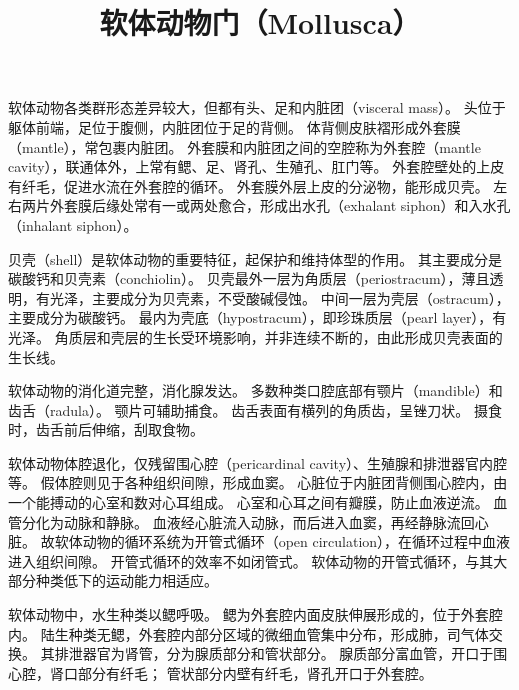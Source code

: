 \documentclass[11pt]{article}
\title{软体动物门（Mollusca）}
\date{}
\begin{document}
  \maketitle

  \linenumbers
软体动物各类群形态差异较大，但都有头、足和内脏团（visceral mass）。
头位于躯体前端，足位于腹侧，内脏团位于足的背侧。
体背侧皮肤褶形成外套膜（mantle），常包裹内脏团。
外套膜和内脏团之间的空腔称为外套腔（mantle cavity），联通体外，上常有鳃、足、肾孔、生殖孔、肛门等。
外套腔壁处的上皮有纤毛，促进水流在外套腔的循环。
外套膜外层上皮的分泌物，能形成贝壳。
左右两片外套膜后缘处常有一或两处愈合，形成出水孔（exhalant siphon）和入水孔（inhalant siphon）。

\newline

贝壳（shell）是软体动物的重要特征，起保护和维持体型的作用。
其主要成分是碳酸钙和贝壳素（conchiolin）。
贝壳最外一层为角质层（periostracum），薄且透明，有光泽，主要成分为贝壳素，不受酸碱侵蚀。
中间一层为壳层（ostracum），主要成分为碳酸钙。
最内为壳底（hypostracum），即珍珠质层（pearl layer），有光泽。
角质层和壳层的生长受环境影响，并非连续不断的，由此形成贝壳表面的生长线。

\newline

软体动物的消化道完整，消化腺发达。
多数种类口腔底部有颚片（mandible）和齿舌（radula）。
颚片可辅助捕食。
齿舌表面有横列的角质齿，呈锉刀状。
摄食时，齿舌前后伸缩，刮取食物。

\newline

软体动物体腔退化，仅残留围心腔（pericardinal cavity）、生殖腺和排泄器官内腔等。
假体腔则见于各种组织间隙，形成血窦。
心脏位于内脏团背侧围心腔内，由一个能搏动的心室和数对心耳组成。
心室和心耳之间有瓣膜，防止血液逆流。
血管分化为动脉和静脉。
血液经心脏流入动脉，而后进入血窦，再经静脉流回心脏。
故软体动物的循环系统为开管式循环（open circulation），在循环过程中血液进入组织间隙。
开管式循环的效率不如闭管式。
软体动物的开管式循环，与其大部分种类低下的运动能力相适应。

\newline

软体动物中，水生种类以鳃呼吸。
鳃为外套腔内面皮肤伸展形成的，位于外套腔内。
陆生种类无鳃，外套腔内部分区域的微细血管集中分布，形成肺，司气体交换。
其排泄器官为肾管，分为腺质部分和管状部分。
腺质部分富血管，开口于围心腔，肾口部分有纤毛；
管状部分内壁有纤毛，肾孔开口于外套腔。

\newline
\end{document}
